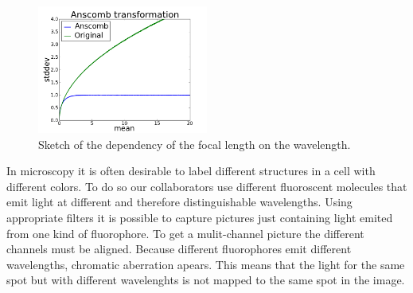 \begin{figure}
	\centering
	\includegraphics[width = 0.5\textwidth]{pictures/anscombe.png}
	\caption[Chromatic aberration, picture taken from http://en.wikipedia.org/wiki/File:Chromatic_abberation_lens_diagram.svg, at 23rd of May 2013]{Sketch of the dependency of the focal length on the wavelength.}
	\label{wikibild1}
	
\end{figure}
In microscopy it is often desirable to label different structures in a cell with
different colors. To do so our collaborators use different fluoroscent molecules
that emit light at different and therefore distinguishable wavelengths. Using appropriate
filters it is possible to capture pictures just containing light emited from one
kind of fluorophore. To get a mulit-channel picture the different channels must be
aligned. Because different fluorophores emit different wavelengths, chromatic
aberration apears. This means that the light for the same spot but with
different wavelenghts is not mapped to the same spot in the image. 